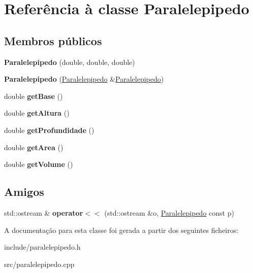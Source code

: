 \hypertarget{classParalelepipedo}{\section{Referência à classe Paralelepipedo}
\label{classParalelepipedo}
}
\subsection*{Membros públicos}
\begin{DoxyCompactItemize}
\item 
\hypertarget{classParalelepipedo_a4e150bb9ef58dd26e342837081942b9c}{{\bfseries Paralelepipedo} (double, double, double)}\label{classParalelepipedo_a4e150bb9ef58dd26e342837081942b9c}

\item 
\hypertarget{classParalelepipedo_a22502818431c845503d4d8c28449f6a5}{{\bfseries Paralelepipedo} (\hyperlink{classParalelepipedo}{Paralelepipedo} \&\hyperlink{classParalelepipedo}{Paralelepipedo})}\label{classParalelepipedo_a22502818431c845503d4d8c28449f6a5}

\item 
\hypertarget{classParalelepipedo_ada811c16f87ea1e1985e399cedc7491e}{double {\bfseries get\-Base} ()}\label{classParalelepipedo_ada811c16f87ea1e1985e399cedc7491e}

\item 
\hypertarget{classParalelepipedo_a7c3f96e079add050e18bdbaed520039a}{double {\bfseries get\-Altura} ()}\label{classParalelepipedo_a7c3f96e079add050e18bdbaed520039a}

\item 
\hypertarget{classParalelepipedo_a28bb5f1cb0a688374fcfff930352e44d}{double {\bfseries get\-Profundidade} ()}\label{classParalelepipedo_a28bb5f1cb0a688374fcfff930352e44d}

\item 
\hypertarget{classParalelepipedo_a5b03a175ca6637fed40897d14b457d62}{double {\bfseries get\-Area} ()}\label{classParalelepipedo_a5b03a175ca6637fed40897d14b457d62}

\item 
\hypertarget{classParalelepipedo_a37f663b604e0406016a6c0edebb568d9}{double {\bfseries get\-Volume} ()}\label{classParalelepipedo_a37f663b604e0406016a6c0edebb568d9}

\end{DoxyCompactItemize}
\subsection*{Amigos}
\begin{DoxyCompactItemize}
\item 
\hypertarget{classParalelepipedo_ac19a06601bb4bf30fab5e5255688e1ac}{std\-::ostream \& {\bfseries operator$<$$<$} (std\-::ostream \&o, \hyperlink{classParalelepipedo}{Paralelepipedo} const p)}\label{classParalelepipedo_ac19a06601bb4bf30fab5e5255688e1ac}

\end{DoxyCompactItemize}


A documentação para esta classe foi gerada a partir dos seguintes ficheiros\-:\begin{DoxyCompactItemize}
\item 
include/paralelepipedo.\-h\item 
src/paralelepipedo.\-cpp\end{DoxyCompactItemize}
